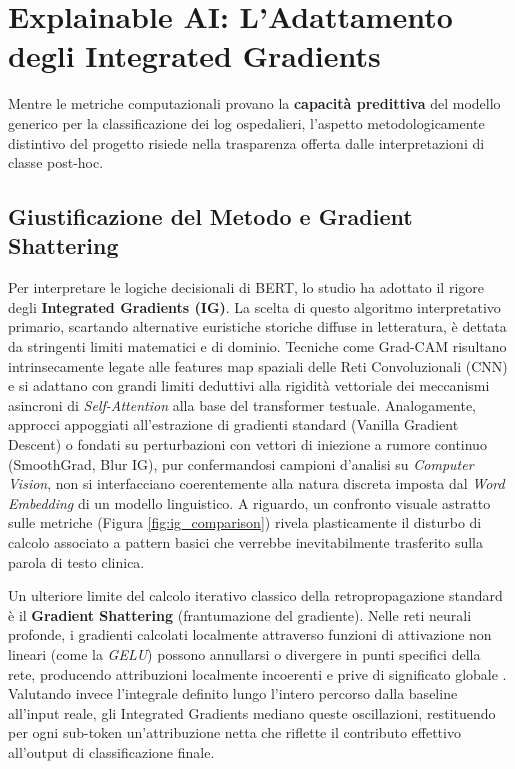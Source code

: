 \section{Explainable AI: L'Adattamento degli Integrated Gradients}
Mentre le metriche computazionali provano la \textbf{capacità predittiva} del modello generico per la classificazione dei log ospedalieri, l'aspetto metodologicamente distintivo del progetto risiede nella trasparenza offerta dalle interpretazioni di classe post-hoc. 

\subsection{Giustificazione del Metodo e Gradient Shattering}
Per interpretare le logiche decisionali di BERT, lo studio ha adottato il rigore degli \textbf{Integrated Gradients (IG)}. La scelta di questo algoritmo interpretativo primario, scartando alternative euristiche storiche diffuse in letteratura, è dettata da stringenti limiti matematici e di dominio. Tecniche come Grad-CAM risultano intrinsecamente legate alle features map spaziali delle Reti Convoluzionali (CNN) e si adattano con grandi limiti deduttivi alla rigidità vettoriale dei meccanismi asincroni di \textit{Self-Attention} alla base del transformer testuale. Analogamente, approcci appoggiati all'estrazione di gradienti standard (Vanilla Gradient Descent) o fondati su perturbazioni con vettori di iniezione a rumore continuo (SmoothGrad, Blur IG), pur confermandosi campioni d'analisi su \textit{Computer Vision}, non si interfacciano coerentemente alla natura discreta imposta dal \textit{Word Embedding} di un modello linguistico. A riguardo, un confronto visuale astratto sulle metriche (Figura \ref{fig:ig_comparison}) rivela plasticamente il disturbo di calcolo associato a pattern basici che verrebbe inevitabilmente trasferito sulla parola di testo clinica.

Un ulteriore limite del calcolo iterativo classico della retropropagazione standard è il \textbf{Gradient Shattering} (frantumazione del gradiente). Nelle reti neurali profonde, i gradienti calcolati localmente attraverso funzioni di attivazione non lineari (come la \textit{GELU}) possono annullarsi o divergere in punti specifici della rete, producendo attribuzioni localmente incoerenti e prive di significato globale \cite{sundararajan2017axiomatic}.
Valutando invece l'integrale definito lungo l'intero percorso dalla baseline all'input reale, gli Integrated Gradients mediano queste oscillazioni, restituendo per ogni sub-token un'attribuzione netta che riflette il contributo effettivo all'output di classificazione finale.

